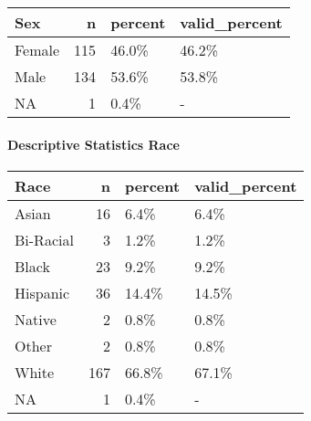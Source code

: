 \documentclass[
]{article}
\newenvironment{Shaded}{\begin{snugshade}}{\end{snugshade}}
\newcommand{\DataTypeTok}[1]{\textcolor[rgb]{0.00,0.34,0.68}{#1}}
\newcommand{\DecValTok}[1]{\textcolor[rgb]{0.69,0.50,0.00}{#1}}
\newcommand{\KeywordTok}[1]{\textcolor[rgb]{0.12,0.11,0.11}{\textbf{#1}}}
\newcommand{\NormalTok}[1]{\textcolor[rgb]{0.12,0.11,0.11}{#1}}
\newcommand{\OperatorTok}[1]{\textcolor[rgb]{0.12,0.11,0.11}{#1}}
\newcommand{\StringTok}[1]{\textcolor[rgb]{0.75,0.01,0.01}{#1}}
\begin{document}
\begin{Shaded}
\end{Shaded}

\begin{longtable}[]{@{}lrll@{}}
\toprule
Sex & n & percent & valid\_percent\tabularnewline
\midrule
\endhead
Female & 115 & 46.0\% & 46.2\%\tabularnewline
Male & 134 & 53.6\% & 53.8\%\tabularnewline
NA & 1 & 0.4\% & -\tabularnewline
\bottomrule
\end{longtable}

\pagebreak

\hypertarget{descriptive-statistics-race}{%
\paragraph{Descriptive Statistics
Race}\label{descriptive-statistics-race}}

\begin{Shaded}
\end{Shaded}

\begin{longtable}[]{@{}lrll@{}}
\toprule
Race & n & percent & valid\_percent\tabularnewline
\midrule
\endhead
Asian & 16 & 6.4\% & 6.4\%\tabularnewline
Bi-Racial & 3 & 1.2\% & 1.2\%\tabularnewline
Black & 23 & 9.2\% & 9.2\%\tabularnewline
Hispanic & 36 & 14.4\% & 14.5\%\tabularnewline
Native & 2 & 0.8\% & 0.8\%\tabularnewline
Other & 2 & 0.8\% & 0.8\%\tabularnewline
White & 167 & 66.8\% & 67.1\%\tabularnewline
NA & 1 & 0.4\% & -\tabularnewline
\bottomrule
\end{longtable}
\end{document}
